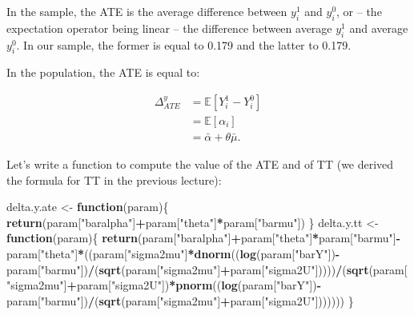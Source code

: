 \documentclass[]{book}
\newenvironment{Shaded}{\begin{snugshade}}{\end{snugshade}}
\newcommand{\ControlFlowTok}[1]{\textcolor[rgb]{0.13,0.29,0.53}{\textbf{#1}}}
\newcommand{\KeywordTok}[1]{\textcolor[rgb]{0.13,0.29,0.53}{\textbf{#1}}}
\newcommand{\NormalTok}[1]{#1}
\newcommand{\OperatorTok}[1]{\textcolor[rgb]{0.81,0.36,0.00}{\textbf{#1}}}
\newcommand{\StringTok}[1]{\textcolor[rgb]{0.31,0.60,0.02}{#1}}
\newcommand{\esp}[1]{\mathbb{E}[ #1 ]}
\theoremstyle{definition}
\theoremstyle{definition}
\theoremstyle{definition}
\theoremstyle{remark}
\begin{document}
In the sample, the ATE is the average difference between \(y_i^1\) and \(y_i^0\), or -- the expectation operator being linear -- the difference between average \(y_i^1\) and average \(y_i^0\).
In our sample, the former is equal to 0.179 and the latter to 0.179.

In the population, the ATE is equal to:

\begin{align*}
\Delta^y_{ATE} & = \esp{Y_i^1-Y_i^0} \\
              & = \esp{\alpha_i} \\
              & = \bar{\alpha}+\theta\bar{\mu}.
\end{align*}

Let's write a function to compute the value of the ATE and of TT (we derived the formula for TT in the previous lecture):

\begin{Shaded}
\begin{Highlighting}[]
\NormalTok{delta.y.ate <-}\StringTok{ }\ControlFlowTok{function}\NormalTok{(param)\{}
  \KeywordTok{return}\NormalTok{(param[}\StringTok{"baralpha"}\NormalTok{]}\OperatorTok{+}\NormalTok{param[}\StringTok{"theta"}\NormalTok{]}\OperatorTok{*}\NormalTok{param[}\StringTok{"barmu"}\NormalTok{])}
\NormalTok{\}}
\NormalTok{delta.y.tt <-}\StringTok{ }\ControlFlowTok{function}\NormalTok{(param)\{}
  \KeywordTok{return}\NormalTok{(param[}\StringTok{"baralpha"}\NormalTok{]}\OperatorTok{+}\NormalTok{param[}\StringTok{"theta"}\NormalTok{]}\OperatorTok{*}\NormalTok{param[}\StringTok{"barmu"}\NormalTok{]}\OperatorTok{-}\NormalTok{param[}\StringTok{"theta"}\NormalTok{]}\OperatorTok{*}\NormalTok{((param[}\StringTok{"sigma2mu"}\NormalTok{]}\OperatorTok{*}\KeywordTok{dnorm}\NormalTok{((}\KeywordTok{log}\NormalTok{(param[}\StringTok{"barY"}\NormalTok{])}\OperatorTok{-}\NormalTok{param[}\StringTok{"barmu"}\NormalTok{])}\OperatorTok{/}\NormalTok{(}\KeywordTok{sqrt}\NormalTok{(param[}\StringTok{"sigma2mu"}\NormalTok{]}\OperatorTok{+}\NormalTok{param[}\StringTok{"sigma2U"}\NormalTok{]))))}\OperatorTok{/}\NormalTok{(}\KeywordTok{sqrt}\NormalTok{(param[}\StringTok{"sigma2mu"}\NormalTok{]}\OperatorTok{+}\NormalTok{param[}\StringTok{"sigma2U"}\NormalTok{])}\OperatorTok{*}\KeywordTok{pnorm}\NormalTok{((}\KeywordTok{log}\NormalTok{(param[}\StringTok{"barY"}\NormalTok{])}\OperatorTok{-}\NormalTok{param[}\StringTok{"barmu"}\NormalTok{])}\OperatorTok{/}\NormalTok{(}\KeywordTok{sqrt}\NormalTok{(param[}\StringTok{"sigma2mu"}\NormalTok{]}\OperatorTok{+}\NormalTok{param[}\StringTok{"sigma2U"}\NormalTok{]))))))}
\NormalTok{\}}
\end{Highlighting}
\end{Shaded}
\end{document}
